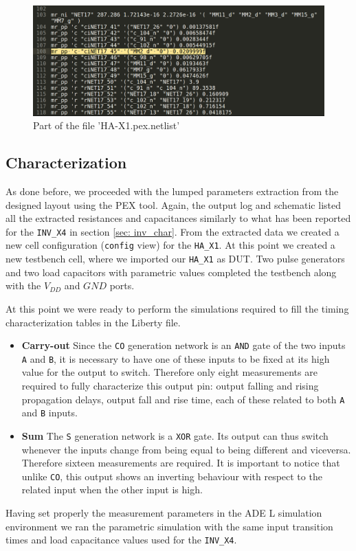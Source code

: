\documentclass[a4paper]{article}
\newcommand{\inv}{\texttt{INV\_X4}\xspace}
\newcommand{\ha}{\texttt{HA\_X1}\xspace}
\begin{document}
\begin{figure}[H]
      \centering
       \includegraphics[width=12cm]{./Images/HA/HAX1_PEX_netlist.png}
\caption{Part of the file 'HA-X1.pex.netlist'}
\label{fig: PEX0_netlist}
\end{figure}


\subsection{Characterization}
As done before, we proceeded with the lumped parameters extraction from the designed layout using the PEX tool. Again, the output log and schematic listed all the extracted resistances and capacitances similarly to what has been reported for the \inv in section \ref{sec: inv_char}. From the extracted data we created a new cell configuration (\texttt{config} view) for the \ha. At this point we created a new testbench cell, where we imported our \ha as DUT. Two pulse generators and two load capacitors with parametric values completed the testbench along with the $V_{DD}$ and $GND$ ports.

At this point we were ready to perform the simulations required to fill the timing characterization tables in the Liberty file.
\begin{itemize}
	\item \textbf{Carry-out} Since the \texttt{CO} generation network is an \texttt{AND} gate of the two inputs \texttt{A} and \texttt{B}, it is necessary to have one of these inputs to be fixed at its high value for the output to switch. Therefore only eight measurements are required to fully characterize this output pin: output falling and rising propagation delays, output fall and rise time, each of these related to both \texttt{A} and \texttt{B} inputs.

	\item \textbf{Sum} The \texttt{S} generation network is a \texttt{XOR} gate. Its output can thus switch whenever the inputs change from being equal to being different and viceversa. Therefore sixteen measurements are required. It is important to notice that unlike \texttt{CO}, this output shows an inverting behaviour with respect to the related input when the other input is high.
\end{itemize}

Having set properly the measurement parameters in the ADE L simulation environment we ran the parametric simulation with the same input transition times and load capacitance values used for the \inv. 
\end{document}
